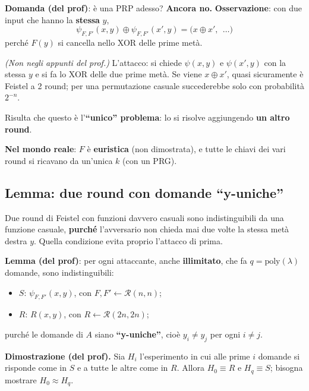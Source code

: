 \textbf{Domanda (del prof)}: è una PRP adesso? \textbf{Ancora no.} \textbf{Osservazione}: con due input che hanno la \textbf{stessa} \(y\),
\[
\psi_{F,F'}(x, y) \oplus \psi_{F,F'}(x', y) = \big(x \oplus x',\ \ \dots\big)
\]
perché \(F(y)\) si cancella nello XOR delle prime metà.

\begin{nota}
\emph{(Non negli appunti del prof.)} L'attacco: si chiede \(\psi(x, y)\) e \(\psi(x', y)\) con la stessa \(y\) e si fa lo XOR delle due prime metà. Se viene \(x \oplus x'\), quasi sicuramente è Feistel a 2 round; per una permutazione casuale succederebbe solo con probabilità \(2^{-n}\).
\end{nota}

Risulta che questo è l'\textbf{``unico'' problema}: lo si risolve aggiungendo \textbf{un altro round}.

\textbf{Nel mondo reale}: \(F\) è \textbf{euristica} (non dimostrata), e tutte le chiavi dei vari round si ricavano da un'unica \(k\) (con un PRG).

\subsection{Lemma: due round con domande ``y-uniche''}

\begin{inbreve}
Due round di Feistel con funzioni davvero casuali sono indistinguibili da una funzione casuale, \textbf{purché} l'avversario non chieda mai due volte la stessa metà destra \(y\). Quella condizione evita proprio l'attacco di prima.
\end{inbreve}

\textbf{Lemma (del prof)}: per ogni attaccante, anche \textbf{illimitato}, che fa \(q = \text{poly}(\lambda)\) domande, sono indistinguibili:
\begin{itemize}
  \item \(S\): \(\psi_{F, F'}(x, y)\), con \(F, F' \leftarrow \mathcal{R}(n, n)\);
  \item \(R\): \(R(x, y)\), con \(R \leftarrow \mathcal{R}(2n, 2n)\);
\end{itemize}
purché le domande di \(A\) siano \textbf{``y-uniche''}, cioè \(y_i \ne y_j\) per ogni \(i \ne j\).

\textbf{Dimostrazione (del prof).} Sia \(H_i\) l'esperimento in cui alle prime \(i\) domande si risponde come in \(S\) e a tutte le altre come in \(R\). Allora \(H_0 \equiv R\) e \(H_q \equiv S\); bisogna mostrare \(H_0 \approx H_q\).


